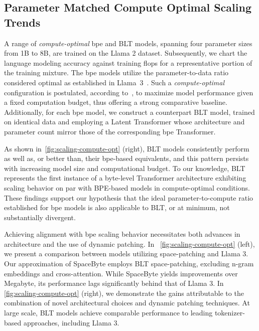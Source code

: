 \subsection{Parameter Matched Compute Optimal Scaling Trends}
\label{section:parameter-matched-scaling}
A range of \textit{compute-optimal} bpe and {\textsc BLT} models, spanning four parameter sizes from 1B to 8B, are trained on the Llama 2 dataset. Subsequently, we chart the language modeling accuracy against training flops for a representative portion of the training mixture. The bpe models utilize the parameter-to-data ratio considered optimal as established in Llama~3~\citep{dubey2024llama}. Such a \textit{compute-optimal} configuration is postulated, according to~\citep{hoffmann2022training}, to maximize model performance given a fixed computation budget, thus offering a strong comparative baseline. Additionally, for each bpe model, we construct a counterpart {\textsc BLT} model, trained on identical data and employing a Latent Transformer whose architecture and parameter count mirror those of the corresponding bpe Transformer.

As shown in~\autoref{fig:scaling-compute-opt} (right), {\textsc BLT} models consistently perform as well as, or better than, their bpe-based equivalents, and this pattern persists with increasing model size and computational budget. To our knowledge, {\textsc BLT} represents the first instance of a byte-level Transformer architecture exhibiting scaling behavior on par with BPE-based models in compute-optimal conditions. These findings support our hypothesis that the ideal parameter-to-compute ratio established for bpe models is also applicable to {\textsc BLT}, or at minimum, not substantially divergent.

Achieving alignment with bpe scaling behavior necessitates both advances in architecture and the use of dynamic patching. In ~\autoref{fig:scaling-compute-opt} (left), we present a comparison between models utilizing space-patching and Llama 3. Our approximation of SpaceByte \citep{slagle2024spacebyte} employs {\textsc BLT} space-patching, excluding n-gram embeddings and cross-attention. While SpaceByte yields improvements over Megabyte, its performance lags significantly behind that of Llama 3. In \autoref{fig:scaling-compute-opt} (right), we demonstrate the gains attributable to the combination of novel architectural choices and dynamic patching techniques. At large scale, {\textsc BLT} models achieve comparable performance to leading tokenizer-based approaches, including Llama 3.

